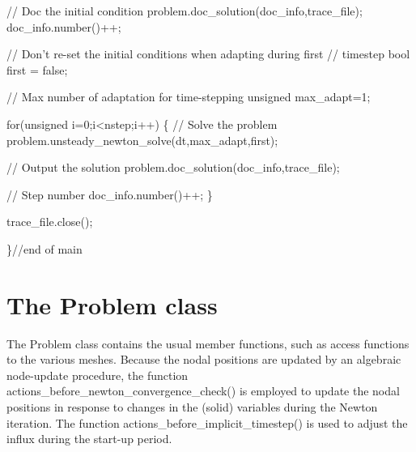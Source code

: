 \begin{DoxyCodeInclude}

 \textcolor{comment}{// Doc the initial condition}
 problem.doc\_solution(doc\_info,trace\_file);
 doc\_info.number()++; 
 
 \textcolor{comment}{// Don't re-set the initial conditions when adapting during first}
 \textcolor{comment}{// timestep}
 \textcolor{keywordtype}{bool} first = \textcolor{keyword}{false};
 
 \textcolor{comment}{// Max number of adaptation for time-stepping}
 \textcolor{keywordtype}{unsigned} max\_adapt=1;
 
 \textcolor{keywordflow}{for}(\textcolor{keywordtype}{unsigned} i=0;i<nstep;i++)
  \{ 
  \textcolor{comment}{// Solve the problem}
  problem.unsteady\_newton\_solve(dt,max\_adapt,first); 
  
  \textcolor{comment}{// Output the solution}
  problem.doc\_solution(doc\_info,trace\_file);
  
  \textcolor{comment}{// Step number}
  doc\_info.number()++;
 \}
 
 trace\_file.close(); 

\}\textcolor{comment}{//end of main}

\end{DoxyCodeInclude}




 

\hypertarget{index_problem}{}\section{The Problem class}\label{index_problem}
The {\ttfamily Problem} class contains the usual member functions, such as access functions to the various meshes. Because the nodal positions are updated by an algebraic node-\/update procedure, the function {\ttfamily actions\+\_\+before\+\_\+newton\+\_\+convergence\+\_\+check()} is employed to update the nodal positions in response to changes in the (solid) variables during the Newton iteration. The function {\ttfamily actions\+\_\+before\+\_\+implicit\+\_\+timestep()} is used to adjust the influx during the start-\/up period.


